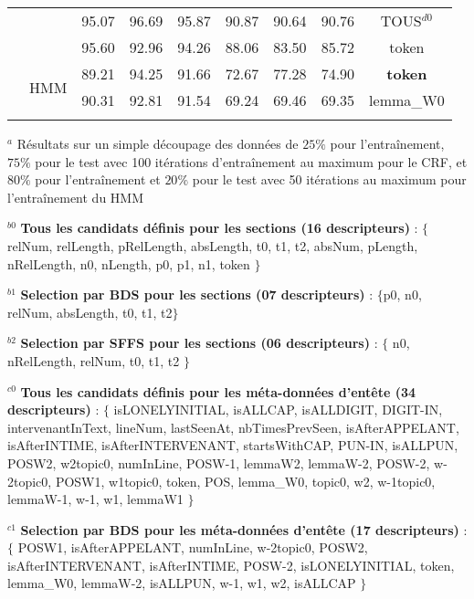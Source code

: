 \begin{table}[!htb]
\begin{center}
\begin{tabular}{p{1cm}|c|ccc|ccc|c}
                &  & 95.07 & 96.69 & 95.87 & 90.87 & 90.64 & 90.76 & TOUS$^{d0}$ \\
                &  & 95.60 & 92.96 & 94.26 & 88.06 & 83.50 & 85.72 & token \\ \cline{2-9}
                 &  \multirow{2}{*}{HMM} & 89.21 & 94.25 & 91.66 & 72.67 & 77.28 & 74.90 &  \textbf{token} \\ 
  &   & 90.31 & 92.81 & 91.54 & 69.24 & 69.46 & 69.35 &  lemma\_W0 \\ 
\noalign{\smallskip}\hline\noalign{\smallskip}
\end{tabular}

\end{center}

$^a$ Résultats sur un simple découpage des données de $25\%$ pour l'entraînement,  $75\%$ pour le test avec 100 itérations d'entraînement au maximum  pour le CRF, et $80\%$ pour l'entraînement et $20\%$ pour le test avec 50 itérations au maximum pour l'entraînement du HMM

$^{b0}$ \textbf{Tous les candidats définis pour les sections (16 descripteurs) }: $\lbrace$ relNum, relLength, pRelLength, absLength, t0, t1, t2, absNum, pLength, nRelLength, n0, nLength, p0, p1, n1, token $\rbrace$ 

$^{b1}$ \textbf{Selection par BDS pour les sections (07 descripteurs)} : $\lbrace$p0, n0, relNum, absLength, t0, t1, t2$\rbrace$ 

$^{b2}$ \textbf{Selection par SFFS pour les sections (06 descripteurs)} : $\lbrace$ n0, nRelLength, relNum, t0, t1, t2 $\rbrace$ 

$^{c0}$ \textbf{Tous les candidats définis pour les méta-données d'entête (34 descripteurs)} : $\lbrace$ isLONELYINITIAL, isALLCAP, isALLDIGIT, DIGIT-IN, intervenantInText, lineNum, lastSeenAt, nbTimesPrevSeen, isAfterAPPELANT, isAfterINTIME, isAfterINTERVENANT, startsWithCAP, PUN-IN, isALLPUN, POSW2, w2topic0, numInLine, POSW-1, lemmaW2, lemmaW-2, POSW-2, w-2topic0, POSW1, w1topic0, token, POS, lemma\_W0, topic0, w2, w-1topic0, lemmaW-1, w-1, w1, lemmaW1 $\rbrace$ 

 $^{c1}$ \textbf{Selection par BDS pour les méta-données d'entête (17 descripteurs) }:  $\lbrace$ POSW1, isAfterAPPELANT, numInLine, w-2topic0, POSW2, isAfterINTERVENANT, isAfterINTIME, POSW-2, isLONELYINITIAL, token, lemma\_W0, lemmaW-2, isALLPUN, w-1, w1, w2, isALLCAP $\rbrace$ 


\end{table}
